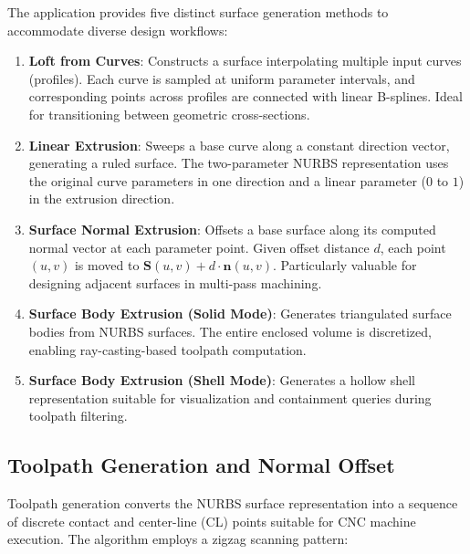 \documentclass[a4paper,12pt]{article}
\begin{document}
The application provides five distinct surface generation methods to accommodate
diverse design workflows:
\begin{enumerate}
  \item \textbf{Loft from Curves}: Constructs a surface interpolating multiple
    input curves (profiles). Each curve is sampled at uniform parameter
    intervals, and corresponding points across profiles are connected with
    linear B-splines. Ideal for transitioning between geometric cross-sections.

  \item \textbf{Linear Extrusion}: Sweeps a base curve along a constant
    direction vector, generating a ruled surface. The two-parameter NURBS
    representation uses the original curve parameters in one direction and a
    linear parameter ($0$ to $1$) in the extrusion direction.

  \item \textbf{Surface Normal Extrusion}: Offsets a base surface along its
    computed normal vector at each parameter point. Given offset distance $d$,
    each point $(u, v)$ is moved to $\mathbf{S}(u, v) + d \cdot \mathbf{n}(u, v)$.
    Particularly valuable for designing adjacent surfaces in multi-pass machining.

  \item \textbf{Surface Body Extrusion (Solid Mode)}: Generates triangulated
    surface bodies from NURBS surfaces. The entire enclosed volume is
    discretized, enabling ray-casting-based toolpath computation.

  \item \textbf{Surface Body Extrusion (Shell Mode)}: Generates a hollow shell
    representation suitable for visualization and containment queries during
    toolpath filtering.
\end{enumerate}

\subsection{Toolpath Generation and Normal Offset}

Toolpath generation converts the NURBS surface representation into a sequence
of discrete contact and center-line (CL) points suitable for CNC machine
execution. The algorithm employs a zigzag scanning pattern:
\end{document}
